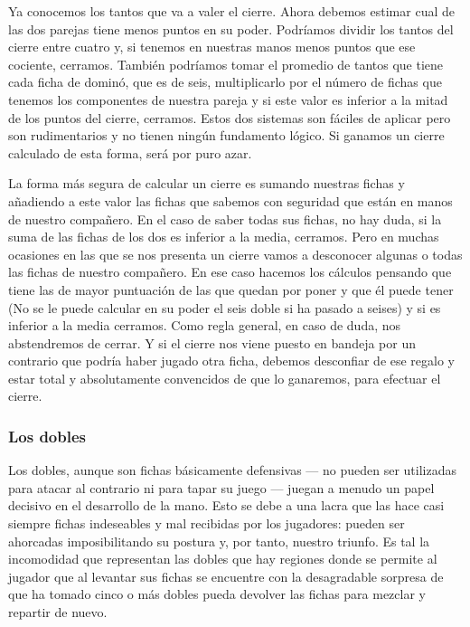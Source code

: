 Ya conocemos los tantos que va a valer el cierre. Ahora debemos estimar cual de las dos parejas tiene menos puntos en su
poder. Podríamos dividir los tantos del cierre entre cuatro y, si tenemos en nuestras manos menos puntos que ese cociente,
cerramos. También podríamos tomar el promedio de tantos que tiene cada ficha de dominó, que es de seis, multiplicarlo por
el número de fichas que tenemos los componentes de nuestra pareja y si este valor es inferior a la mitad de los puntos del
cierre, cerramos. Estos dos sistemas son fáciles de aplicar pero son rudimentarios y no tienen ningún fundamento lógico.
Si ganamos un cierre calculado de esta forma, será por puro azar.

La forma más segura de calcular un cierre es sumando nuestras fichas y añadiendo a este valor las fichas que sabemos con
seguridad que están en manos de nuestro compañero. En el caso de saber todas sus fichas, no hay duda, si la suma de las
fichas de los dos es inferior a la media, cerramos. Pero en muchas ocasiones en las que se nos presenta un cierre vamos
a desconocer algunas o todas las fichas de nuestro compañero. En ese caso hacemos los cálculos pensando que tiene las de
mayor puntuación de las que quedan por poner y que él puede tener (No se le puede calcular en su poder el seis doble si
ha pasado a seises) y si es inferior a la media cerramos. Como regla general, en caso de duda, nos abstendremos de cerrar.
Y si el cierre nos viene puesto en bandeja por un contrario que podría haber jugado otra ficha, debemos desconfiar de ese
regalo y estar total y absolutamente convencidos de que lo ganaremos, para efectuar el cierre.

\subsubsection{Los dobles}

Los dobles, aunque son fichas básicamente defensivas --- no pueden ser utilizadas para atacar al contrario ni para
tapar su juego --- juegan a menudo un papel decisivo en el desarrollo de la mano. Esto se debe a una lacra que las hace
casi siempre fichas indeseables y mal recibidas por los jugadores: pueden ser ahorcadas imposibilitando su postura y,
por tanto, nuestro triunfo. Es tal la incomodidad que representan las dobles que hay regiones donde se permite al jugador
que al levantar sus fichas se encuentre con la desagradable sorpresa de que ha tomado cinco o más dobles pueda devolver las
fichas para mezclar y repartir de nuevo. \\

